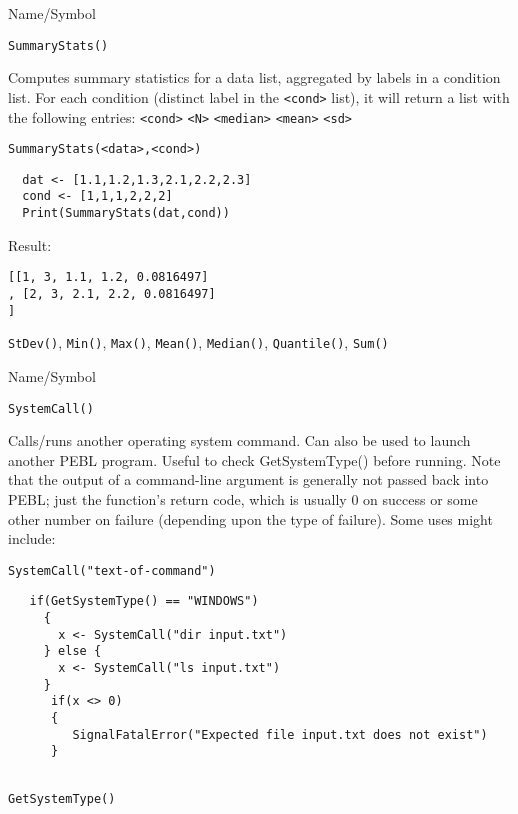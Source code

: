 \begin{desc}{Name/Symbol}
\item[Name/Symbol]  	\verb+SummaryStats()+

\item[Description] Computes summary statistics for a data list,
  aggregated by labels in a condition list.
For each condition (distinct label in the \verb+<cond>+ list), it will 
return a list with the following entries:
\verb+<cond>+ \verb+<N>+ \verb+<median>+ \verb+<mean>+ \verb+<sd>+

\item[Usage]		
\begin{verbatim}
SummaryStats(<data>,<cond>)        
\end{verbatim}

\item[Example]	
\begin{verbatim}
  dat <- [1.1,1.2,1.3,2.1,2.2,2.3]
  cond <- [1,1,1,2,2,2]
  Print(SummaryStats(dat,cond))
\end{verbatim}
Result:
\begin{verbatim}
[[1, 3, 1.1, 1.2, 0.0816497]
, [2, 3, 2.1, 2.2, 0.0816497]
]
\end{verbatim}
\item[See Also]	
  	\verb+StDev()+, \verb+Min()+, \verb+Max()+, \verb+Mean()+, \verb+Median()+, \verb+Quantile()+, \verb+Sum()+
\end{desc}
\rl



\begin{desc}{Name/Symbol}
\item[Name/Symbol]  	\verb+SystemCall()+

\item[Description] Calls/runs another operating system command.  Can also be used to 
launch another PEBL program.  Useful to check GetSystemType() before running.
 Note that the output of a
   command-line argument is generally not passed back into PEBL; just
   the function's return code, which is usually 0 on success or some
   other number on failure (depending upon the type of failure).  Some
   uses might include:

\item[Usage]		
\begin{verbatim}
SystemCall("text-of-command")
\end{verbatim}

\item[Example]	
\begin{verbatim}
   if(GetSystemType() == "WINDOWS")
     {
       x <- SystemCall("dir input.txt") 
     } else {
       x <- SystemCall("ls input.txt") 
     }
      if(x <> 0)
      {
         SignalFatalError("Expected file input.txt does not exist")
      }


\end{verbatim}

\item[See Also]	
  \verb+GetSystemType()+
\end{desc}
\rl




